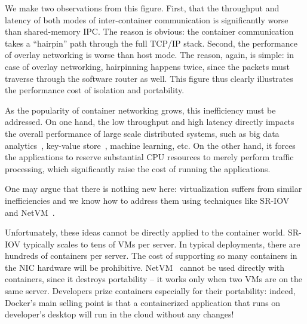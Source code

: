 We make two observations from this figure. First, that the throughput and
latency of both modes of inter-container communication is significantly worse
than shared-memory IPC. The reason is obvious: the container communication takes
a ``hairpin'' path through the full TCP/IP stack. Second, the performance of
overlay networking is worse than host mode. The reason, again, is simple: in
case of overlay networking, hairpinning happens twice, since the packets must
traverse through the software router as well. This figure thus clearly
illustrates the performance cost of isolation and portability.

As the popularity of container networking grows, this inefficiency must be
addressed. On one hand, the low throughput and high latency directly impacts
the overall performance of large scale distributed systems, such as big data
analytics~\cite{choudhury-paper}, key-value store~\cite{farm}, machine learning,
etc.  On the other hand, it forces the applications to reserve substantial CPU
resources to merely perform traffic processing, which significantly raise the
cost of running the applications.

One may argue that there is nothing new here: virtualization suffers from
similar inefficiencies and we know how to address them using techniques like
SR-IOV~\cite{sriov} and NetVM~\cite{netvm}.

Unfortunately, these ideas cannot be directly applied to the container world.
SR-IOV typically scales to tens of VMs per server. In typical deployments, there
are hundreds of containers per server. The cost of supporting so many containers
in the NIC hardware will be prohibitive.  NetVM~\cite{netvm} cannot be used
directly with containers, since it destroys portability -- it works only when
two VMs are on the same server.  Developers prize containers especially for
their portability: indeed, Docker's main selling point is that a containerized
application that runs on developer's desktop will run in the cloud without any
changes! 


